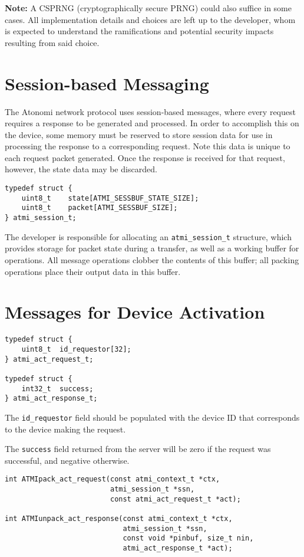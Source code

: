 \textbf{Note:} A CSPRNG (cryptographically secure PRNG) could also suffice
in some cases. All implementation details and choices are left up to the
developer, whom is expected to understand the ramifications and potential
security impacts resulting from said choice.


\section{Session-based Messaging}
The Atonomi network protocol uses session-based messages, where every
request requires a response to be generated and processed. In order to
accomplish this on the device, some memory must be reserved to store
session data for use in processing the response to a corresponding request.
Note this data is unique to each request packet generated. Once the
response is received for that request, however, the state data may be
discarded.

\begin{lstlisting}[name=Session Structure]
typedef struct {
	uint8_t    state[ATMI_SESSBUF_STATE_SIZE];
	uint8_t    packet[ATMI_SESSBUF_SIZE];
} atmi_session_t;
\end{lstlisting}

The developer is responsible for allocating an \texttt{atmi_session_t}
structure, which provides storage for packet state during a transfer,
as well as a working buffer for operations. All message operations
clobber the contents of this buffer; all packing operations
place their output data in this buffer.



\section{Messages for Device Activation}
\begin{lstlisting}[name=Activation Request and Response Structures]
typedef struct {
	uint8_t  id_requestor[32];
} atmi_act_request_t;

typedef struct {
	int32_t  success;
} atmi_act_response_t;
\end{lstlisting}

The \texttt{id_requestor} field should be populated with the device ID that
corresponds to the device making the request.

The \texttt{success} field returned from the server will be zero if the
request was successful, and negative otherwise.

\pagebreak
\begin{lstlisting}[name=Activation Request Packing and Response Unpacking Functions]
int ATMIpack_act_request(const atmi_context_t *ctx,
                         atmi_session_t *ssn,
                         const atmi_act_request_t *act);

int ATMIunpack_act_response(const atmi_context_t *ctx,
                            atmi_session_t *ssn,
                            const void *pinbuf, size_t nin,
                            atmi_act_response_t *act);
\end{lstlisting}

